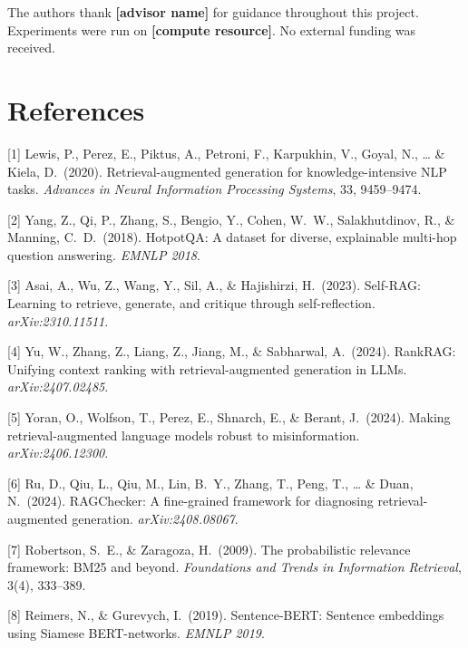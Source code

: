 \documentclass{article}
\newcommand{\placeholder}[1]{\textbf{[#1]}}
\begin{document}
\begin{ack}
The authors thank \placeholder{advisor name} for guidance throughout
this project.  Experiments were run on \placeholder{compute resource}.
No external funding was received.
\end{ack}

\section*{References}
\small

[1] Lewis, P., Perez, E., Piktus, A., Petroni, F., Karpukhin, V.,
Goyal, N., \ldots{} \& Kiela, D.\ (2020).
Retrieval-augmented generation for knowledge-intensive NLP tasks.
\textit{Advances in Neural Information Processing Systems}, 33, 9459–9474.

[2] Yang, Z., Qi, P., Zhang, S., Bengio, Y., Cohen, W.\ W., Salakhutdinov, R.,
\& Manning, C.\ D.\ (2018).
HotpotQA: A dataset for diverse, explainable multi-hop question answering.
\textit{EMNLP 2018}.

[3] Asai, A., Wu, Z., Wang, Y., Sil, A., \& Hajishirzi, H.\ (2023).
Self-RAG: Learning to retrieve, generate, and critique through
self-reflection.
\textit{arXiv:2310.11511}.

[4] Yu, W., Zhang, Z., Liang, Z., Jiang, M., \& Sabharwal, A.\ (2024).
RankRAG: Unifying context ranking with retrieval-augmented generation
in LLMs.
\textit{arXiv:2407.02485}.

[5] Yoran, O., Wolfson, T., Perez, E., Shnarch, E., \& Berant, J.\ (2024).
Making retrieval-augmented language models robust to misinformation.
\textit{arXiv:2406.12300}.

[6] Ru, D., Qiu, L., Qiu, M., Lin, B.\ Y., Zhang, T., Peng, T.,
\ldots{} \& Duan, N.\ (2024).
RAGChecker: A fine-grained framework for diagnosing
retrieval-augmented generation.
\textit{arXiv:2408.08067}.

[7] Robertson, S.\ E., \& Zaragoza, H.\ (2009).
The probabilistic relevance framework: BM25 and beyond.
\textit{Foundations and Trends in Information Retrieval}, 3(4), 333–389.

[8] Reimers, N., \& Gurevych, I.\ (2019).
Sentence-BERT: Sentence embeddings using Siamese BERT-networks.
\textit{EMNLP 2019}.

\appendix
\end{document}
